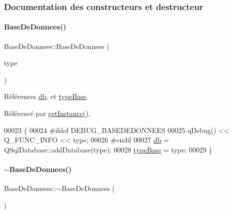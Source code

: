 \subsubsection{Documentation des constructeurs et destructeur}
\mbox{\label{class_base_de_donnees_a10dd177f1008f675ab78c2221b2a6750}} 
\paragraph{\texorpdfstring{Base\+De\+Donnees()}{BaseDeDonnees()}\hspace{0.1cm}{\footnotesize\ttfamily [1/2]}}
{\footnotesize\ttfamily Base\+De\+Donnees\+::\+Base\+De\+Donnees (\begin{DoxyParamCaption}\item[{Q\+String}]{type }\end{DoxyParamCaption})\hspace{0.3cm}{\ttfamily [private]}}



Références \hyperlink{class_base_de_donnees_a3e738dcf443370c46a541677ab619f06}{db}, et \hyperlink{class_base_de_donnees_ab682b82167f494496a6531bfe522b42b}{type\+Base}.



Référencé par \hyperlink{class_base_de_donnees_a80028aa2b6b4fbf30fb2e36357b7d3d3}{get\+Instance()}.


\begin{DoxyCode}
00023 \{
00024 \textcolor{preprocessor}{    #ifdef DEBUG\_BASEDEDONNEES}
00025     qDebug() << Q\_FUNC\_INFO << type;
00026 \textcolor{preprocessor}{    #endif}
00027     \hyperlink{class_base_de_donnees_a3e738dcf443370c46a541677ab619f06}{db} = QSqlDatabase::addDatabase(type);
00028     \hyperlink{class_base_de_donnees_ab682b82167f494496a6531bfe522b42b}{typeBase} = type;
00029 \}
\end{DoxyCode}
\mbox{\label{class_base_de_donnees_a5dc474cdbe003644fb0ca7b8f2ec6b93}} 
\paragraph{\texorpdfstring{$\sim$\+Base\+De\+Donnees()}{~BaseDeDonnees()}\hspace{0.1cm}{\footnotesize\ttfamily [1/2]}}
{\footnotesize\ttfamily Base\+De\+Donnees\+::$\sim$\+Base\+De\+Donnees (\begin{DoxyParamCaption}{ }\end{DoxyParamCaption})\hspace{0.3cm}{\ttfamily [private]}}


